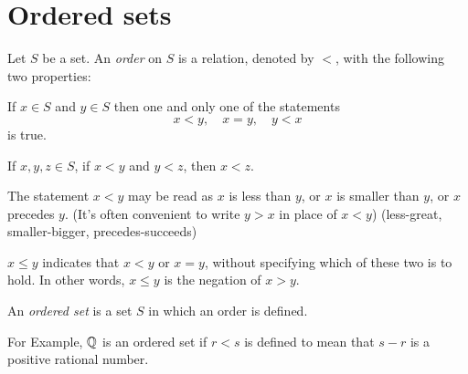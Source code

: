 \section{Ordered sets}

\begin{myDef}\label{myDef:1.5}
    Let $S$ be a set. 
    An \emph{order} on $S$ is a relation, denoted by $<$,
    with the following two properties:
    \begin{asparaenum}[(i)]
        \item If $x\in S$ and $y\in S$ then one and only one of the statements
        \begin{equation*}
            x<y, \quad
            x=y, \quad
            y<x
        \end{equation*}
        is true.    
        \item If $x,y,z\in S$, if $x<y$ and $y<z$, then $x<z$.
    \end{asparaenum}

    The statement $x < y$ may be read as 
    $x$ is less than $y$, or 
    $x$ is smaller than $y$, or
    $x$ precedes $y$.
    (It's often convenient to write $y>x$ in place of $x<y$)
    (less-great, smaller-bigger, precedes-succeeds)


    $x\leq y$ indicates that $x<y$ or $x=y$, 
    without specifying which of these two is to hold.
    In other words, $x\leq y$ is the negation of $x>y$.
\end{myDef}



\begin{myDef}\label{myDef:1.6}
An \emph{ordered set} is a set $S$ in which an order is defined.
\end{myDef}

For Example, ${\protect\mathbb Q} $ is an ordered set 
if $r<s$ is defined to mean that $s-r$ is a positive rational number.

